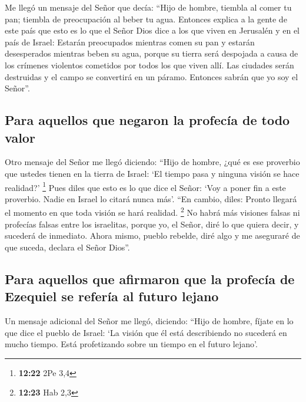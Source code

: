  Me llegó un mensaje del Señor que decía: 
``Hijo de hombre, tiembla al comer tu pan; tiembla de preocupación al
beber tu agua.  Entonces explica a la gente de este país
que esto es lo que el Señor Dios dice a los que viven en Jerusalén y en
el país de Israel: Estarán preocupados mientras comen su pan y estarán
desesperados mientras beben su agua, porque su tierra será despojada a
causa de los crímenes violentos cometidos por todos los que viven allí.
 Las ciudades serán destruidas y el campo se convertirá
en un páramo. Entonces sabrán que yo soy el Señor''.

\hypertarget{para-aquellos-que-negaron-la-profecuxeda-de-todo-valor}{%
\subsection{Para aquellos que negaron la profecía de todo
valor}\label{para-aquellos-que-negaron-la-profecuxeda-de-todo-valor}}

 Otro mensaje del Señor me llegó diciendo:
 ``Hijo de hombre, ¿qué es ese proverbio que ustedes
tienen en la tierra de Israel: `El tiempo pasa y ninguna visión se hace
realidad?' \footnote{\textbf{12:22} 2Pe 3,4}  Pues diles
que esto es lo que dice el Señor: `Voy a poner fin a este proverbio.
Nadie en Israel lo citará nunca más'. ``En cambio, diles: Pronto llegará
el momento en que toda visión se hará realidad. \footnote{\textbf{12:23}
  Hab 2,3}  No habrá más visiones falsas ni profecías
falsas entre los israelitas,  porque yo, el Señor, diré
lo que quiera decir, y sucederá de inmediato. Ahora mismo, pueblo
rebelde, diré algo y me aseguraré de que suceda, declara el Señor
Dios''.

\hypertarget{para-aquellos-que-afirmaron-que-la-profecuxeda-de-ezequiel-se-referuxeda-al-futuro-lejano}{%
\subsection{Para aquellos que afirmaron que la profecía de Ezequiel se
refería al futuro
lejano}\label{para-aquellos-que-afirmaron-que-la-profecuxeda-de-ezequiel-se-referuxeda-al-futuro-lejano}}

 Un mensaje adicional del Señor me llegó, diciendo:
 ``Hijo de hombre, fíjate en lo que dice el pueblo de
Israel: `La visión que él está describiendo no sucederá en mucho tiempo.
Está profetizando sobre un tiempo en el futuro lejano'.

